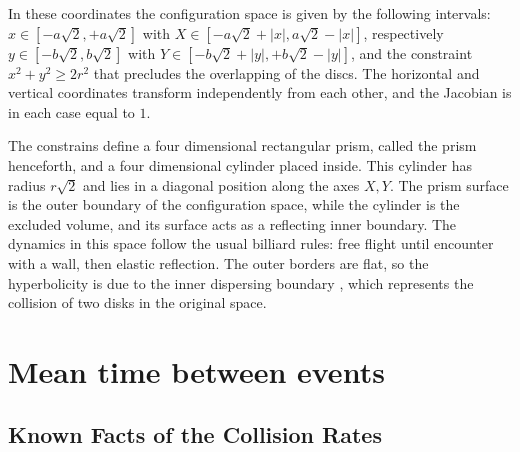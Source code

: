 \documentclass[letterpaper,10pt, jcp, aps]{revtex4-1}
\begin{document}
In these coordinates the configuration space is given by the following
intervals:
$x \in [-a \sqrt{2}, +a \sqrt{2}]$ with 
$X \in [-a \sqrt{2} + |x|, a \sqrt{2} - |x|]$, respectively 
 $y \in [-b \sqrt{2}, b \sqrt{2}]$ with $Y \in [-b \sqrt{2} + |y|, +b \sqrt{2} - |y|]$,  
and the constraint $x^2 + y^2 \ge 2 r^2$ that precludes the overlapping of
the discs.
The horizontal and vertical coordinates transform independently
from each other, and the Jacobian is in each case equal to $1$.

The constrains define a four dimensional
rectangular prism, called the prism henceforth,   
and a four dimensional cylinder placed inside.
This cylinder has radius $r\sqrt{2}$ and lies
in  a diagonal position along the axes $X, Y$.
The prism surface is the outer boundary of the configuration space,
while the cylinder is the excluded volume, and its surface
acts as a reflecting inner boundary.
The dynamics in this space follow
the usual billiard rules: free flight until
encounter with a wall, then elastic reflection.
The outer borders are flat, so the
hyperbolicity is due to the inner dispersing
boundary \cite{Sim99}, which represents the collision of
two disks in the original space.


\section{Mean time between events}


\subsection{Known Facts of the Collision Rates}
\end{document}
